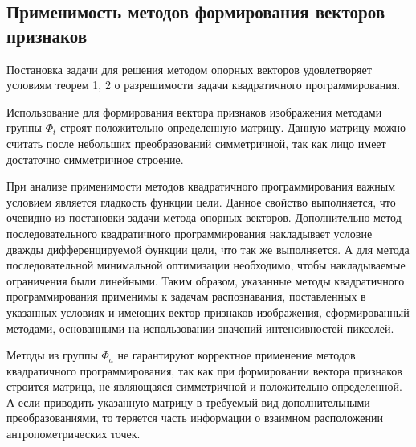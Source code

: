 \documentclass[main.tex]{subfiles}
\begin{document}
\subsection{Применимость методов формирования векторов признаков}
Постановка задачи для решения методом опорных векторов удовлетворяет условиям теорем 1, 2 о разрешимости задачи квадратичного программирования.

Использование для формирования вектора признаков изображения методами группы $\Phi_t$ строят положительно определенную матрицу. Данную матрицу можно считать после небольших преобразований симметричной, так как лицо имеет достаточно симметричное строение.

При анализе применимости методов квадратичного программирования важным условием является гладкость функции цели. Данное свойство выполняется, что очевидно из постановки задачи метода опорных векторов. Дополнительно метод последовательного квадратичного программирования накладывает условие дважды дифференцируемой функции цели, что так же выполняется. А для метода последовательной минимальной оптимизации необходимо, чтобы накладываемые ограничения были линейными. Таким образом, указанные методы квадратичного программирования применимы к задачам распознавания, поставленных в указанных условиях и имеющих вектор признаков изображения, сформированный методами, основанными на использовании значений интенсивностей пикселей.

Методы из группы $\Phi_a$ не гарантируют корректное применение методов квадратичного программирования, так как при формировании вектора признаков строится матрица, не являющаяся симметричной и положительно определенной. А если приводить указанную матрицу в требуемый вид дополнительными преобразованиями, то теряется часть информации о взаимном расположении антропометрических точек.
\end{document}
